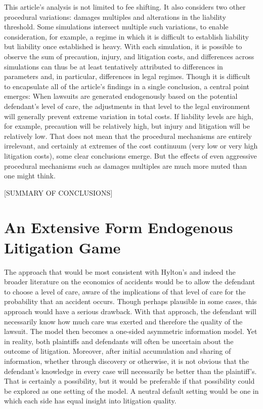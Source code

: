 \documentclass{article}
\begin{document}
This article's analysis is not limited to fee shifting. It also considers two other procedural variations: damages multiples and alterations in the liability threshold. Some simulations intersect multiple such variations, to enable consideration, for example, a regime in which it is difficult to establish liability but liability once established is heavy. With each simulation, it is possible to observe the sum of precaution, injury, and litigation costs, and differences across simulations can thus be at least tentatively attributed to differences in parameters and, in particular, differences in legal regimes. Though it is difficult to encapsulate all of the article's findings in a single conclusion, a central point emerges: When lawsuits are generated endogenously based on the potential defendant's level of care, the adjustments in that level to the legal environment will generally prevent extreme variation in total costs. If liability levels are high, for example, precaution will be relatively high, but injury and litigation will be relatively low. That does not mean that the procedural mechanisms are entirely irrelevant, and certainly at extremes of the cost continuum (very low or very high litigation costs), some clear conclusions emerge. But the effects of even aggressive procedural mechanisms such as damages multiples are much more muted than one might think. 

[SUMMARY OF CONCLUSIONS]

\section{An Extensive Form Endogenous Litigation Game}

The approach that would be most consistent with Hylton's and indeed the broader literature on the economics of accidents would be to allow the defendant to choose a level of care, aware of the implications of that level of care for the probability that an accident occurs. Though perhaps plausible in some cases, this approach would have a serious drawback. With that approach, the defendant will necessarily know how much care was exerted and therefore the quality of the lawsuit. The model then becomes a one-sided asymmetric information model. Yet in reality, both plaintiffs and defendants will often be uncertain about the outcome of litigation. Moreover, after initial accumulation and sharing of information, whether through discovery or otherwise, it is not obvious that the defendant's knowledge in every case will necessarily be better than the plaintiff's. That is certainly a possibility, but it would be preferable if that possibility could be explored as one setting of the model. A neutral default setting would be one in which each side has equal insight into litigation quality. 
\end{document}
